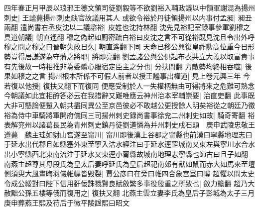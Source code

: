 四年春正月甲辰以琅邪王德文領司徒劉毅等不欲劉裕入輔政議以中領軍謝混為揚州刺史|{
	王謐薨揚州刺史缺官故議用其人}
或欲令裕於丹徒領揚州以内事付孟昶|{
	昶丑兩翻}
遣尚書右丞皮沈以二議諮裕|{
	皮姓也沈持林翻}
沈先見裕記室録事參軍劉穆之具道朝議|{
	朝直遙翻}
穆之偽起如厠密疏白裕曰皮沈之言不可從裕既見沈且令出外呼穆之問之穆之曰晉朝失政日久|{
	朝直遙翻下同}
天命已移公興復皇祚勲高位重今日形勢豈得居謙遂為守藩之將耶|{
	將即亮翻}
劉孟諸公與公俱起布衣共立大義以取富貴事有先後故一時相推非為委體心服宿定臣主之分也|{
	分扶問翻}
力敵勢均終相吞噬|{
	後果如穆之之言}
揚州根本所係不可假人前者以授王謐事出權道|{
	見上卷元興三年}
今若復以他授|{
	復扶又翻下而復同}
便應受制於人一失權柄無由可得將來之危難可熟念今朝議如此宜相酧答必云在我措辭又難唯應云神州治本宰輔崇要|{
	治直吏翻}
此事既大非可懸論便蹔入朝共盡同異公至京邑彼必不敢越公更授餘人明矣裕從之朝廷乃徵裕為侍中車騎將軍開府儀同三司揚州刺史録尚書事徐兖二州刺史如故|{
	騎奇寄翻}
裕表解兖州以諸葛長民為青州刺史鎮丹徒劉道憐為并州刺史戍石頭　庚申武陵忠敬王遵薨　魏主珪如豺山宫遂至甯川|{
	甯川即後漢上谷郡之甯縣也前漢曰寧縣地理志曰于延水出代郡且如縣塞外東至寧入沽水經注曰于延水逕罡城南又東左與寧川水合水出小寧縣西北東南流注于延水又東逕小甯縣故城南地理志寧縣也師古曰且子如翻}
南燕主超尊其母段氏為皇太后妻呼延氏為皇后超祀南郊有獸如鼠而赤大如馬來至壇側須臾大風晝晦羽儀帷幄皆毁裂|{
	賈公彦曰在旁曰帷四合象宫室曰幄}
超懼以問太史令成公綏對曰陛下信用姧佞誅戮賢良賦斂繁多事役殷重之所致也|{
	斂力贍翻}
超乃大赦黜公孫五樓等俄而復用之|{
	復扶又翻}
北燕主雲立妻李氏為皇后子彭城為太子三月庚申葬燕王熙及苻后于徽平陵諡熙曰昭文

